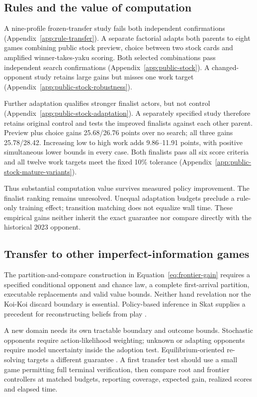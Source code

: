 \documentclass[11pt]{article}
\begin{document}
\subsection{Rules and the value of computation}
A nine-profile frozen-transfer study fails both independent confirmations
(Appendix~\ref{app:rule-transfer}). A separate factorial adapts both parents
to eight games combining public stock preview, choice between two stock
cards and amplified winner-takes-yaku scoring. Both selected combinations
pass independent search confirmations (Appendix~\ref{app:public-stock}).
A changed-opponent study retains large gains but misses one work target
(Appendix~\ref{app:public-stock-robustness}).

Further adaptation qualifies stronger finalist actors, but not control
(Appendix~\ref{app:public-stock-adaptation}). A separately specified study
therefore retains original control and tests the improved finalists against
each other parent. Preview plus choice gains 25.68/26.76 points over no search;
all three gains 25.78/28.42. Increasing low to high work adds 9.86--11.91 points,
with positive simultaneous lower bounds in every case. Both finalists pass
all six score criteria and all twelve work targets meet the fixed 10\%
tolerance (Appendix~\ref{app:public-stock-mature-variants}).

Thus substantial computation value survives measured policy improvement.
The finalist ranking remains unresolved. Unequal adaptation budgets preclude
a rule-only training effect; transition matching does not equalize wall time.
These empirical gains neither inherit the exact guarantee nor compare
directly with the historical 2023 opponent.

\subsection{Transfer to other imperfect-information games}
The partition-and-compare construction in Equation~\ref{eq:frontier-gain}
requires a specified conditional opponent and chance law, a complete
first-arrival partition, executable replacements and valid value bounds.
Neither hand revelation nor the Koi-Koi discard boundary is essential.
Policy-based inference in Skat supplies a precedent for reconstructing beliefs
from play \cite{rebstock2019policy}.

A new domain needs its own tractable boundary and outcome bounds. Stochastic
opponents require action-likelihood weighting; unknown or adapting opponents
require model uncertainty inside the adoption test. Equilibrium-oriented
re-solving targets a different guarantee \cite{burch2014decomposition,brown2020rebel}.
A first transfer test should use a small game permitting full terminal
verification, then compare root and frontier controllers at matched budgets,
reporting coverage, expected gain, realized scores and elapsed time.
\end{document}
